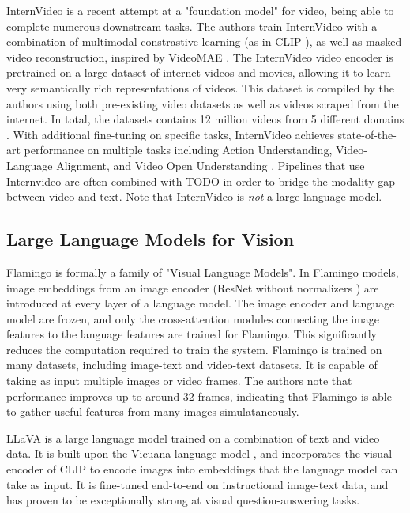 InternVideo is a recent attempt at a "foundation model" for video, being able to complete numerous downstream tasks.
The authors train InternVideo with a combination of multimodal constrastive learning (as in CLIP \cite{clip}), as well as masked video reconstruction, inspired by VideoMAE \cite{videomae}.
The InternVideo video encoder is pretrained on a large dataset of internet videos and movies, allowing it to learn very semantically rich representations of videos.
This dataset is compiled by the authors using both pre-existing video datasets as well as videos scraped from the internet. In total, the datasets contains 12 million videos from 5 different domains \cite{internvideo}.
With additional fine-tuning on specific tasks, InternVideo achieves state-of-the-art performance on multiple tasks including Action Understanding, Video-Language Alignment, and Video Open Understanding \cite{internvideo}.
Pipelines that use Internvideo are often combined with TODO in order to bridge the modality gap between video and text. Note that InternVideo is \textit{not} a large language model.

\subsection{Large Language Models for Vision}

Flamingo is formally a family of "Visual Language Models".
In Flamingo models, image embeddings from an image encoder (ResNet without normalizers \cite{nfnet}) are introduced at every layer of a language model.
The image encoder and language model are frozen, and only the cross-attention modules connecting the image features to the language features are trained for Flamingo.
This significantly reduces the computation required to train the system.
Flamingo is trained on many datasets, including image-text and video-text datasets. It is capable of taking as input multiple images or video frames. 
The authors note that performance improves up to around 32 frames, indicating that Flamingo is able to gather useful features from many images simulataneously.

LLaVA \cite{llava} is a large language model trained on a combination of text and video data.
It is built upon the Vicuana language model \cite{vicuana}, and incorporates the visual encoder of CLIP \cite{clip} to encode images into embeddings that the language model can take as input.
It is fine-tuned end-to-end on instructional image-text data, and has proven to be exceptionally strong at visual question-answering tasks.

